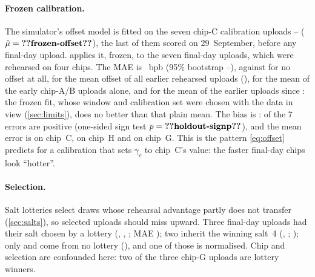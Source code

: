 \paragraph{Frozen calibration.} The simulator's offset model is fitted on the seven chip-C calibration uploads
-- ($\hat\mu = \val{frozen-offset}$), the last of them scored on 29~September, before any final-day
upload. 
applies it, frozen, to the seven final-day uploads, which were rehearsed on four chips. The MAE is
~bpb (95\% bootstrap --), against  for no
offset at all,  for the mean offset of all  earlier rehearsed uploads
(),  for the mean of the  early chip-A/B uploads alone, and
 for the mean of the  earlier uploads since : the frozen fit, whose
window and calibration set were chosen with the data in view (\cref{sec:limits}), does no better than that plain
mean. The bias is : 
of the 7 errors are positive (one-sided sign test $p=\val{holdout-signp}$), and the mean error is
 on chip~C,  on chip~H and  on chip~G. This is the pattern
\cref{eq:offset} predicts for a calibration that sets $\gamma_c$ to chip~C's value: the faster final-day chips
look ``hotter''.

\begin{table}[tbp]
  \centering
  \caption{\textbf{Frozen chip-C calibration} ($\hat\mu=\val{frozen-offset}$, fitted on --) applied to
    the final-day uploads. Error $=$ official $-$ (rehearsal $+\hat\mu$), in $10^{-3}$ bpb. Marks as in
    \cref{tab:offset-chips}.  and  were published to seven decimals
    ( and ).}
  \label{tab:offset-holdout}
  
\end{table}

\paragraph{Selection.} Salt lotteries select draws whose rehearsal advantage partly does not transfer
(\cref{sec:salts}), so selected uploads should miss upward. Three final-day uploads had their salt chosen by a
lottery (, , ; MAE ); two inherit the winning salt~4
(, ; ); only  and  come from no lottery
(), and one of those is normalised. Chip and selection are confounded here: two of the three
chip-G uploads are lottery winners.


